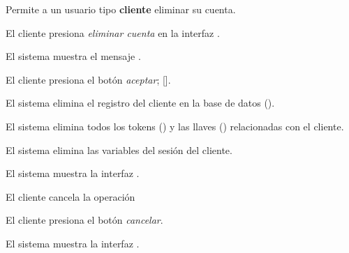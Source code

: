 %
%

{
  Permite a un usuario tipo \textbf{cliente} eliminar su cuenta.

  \begin{trayectoriaPrincipal}

    \item El cliente presiona \textit{eliminar cuenta} en la
      interfaz .

    \item El sistema muestra el mensaje .

    \item El cliente presiona el botón \textit{aceptar};
      [].

    \item El sistema elimina el registro del cliente en la base de datos
      ().

    \item El sistema elimina todos los tokens ()
      y las llaves () relacionadas con el
      cliente.

    \item El sistema elimina las variables del sesión del cliente.

    \item El sistema muestra la interfaz .

  \end{trayectoriaPrincipal}


  \begin{trayectoriaAlternativa}[ta:cancelar]
    {El cliente cancela la operación}

    \item El cliente presiona el botón \textit{cancelar}.

    \item El sistema muestra la interfaz
      .

  \end{trayectoriaAlternativa}
}

